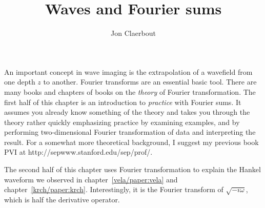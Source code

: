 \def\CAKEDIR{.}

\title{Waves and Fourier sums}
\author{Jon Claerbout}
\maketitle
\label{paper:ft1}
\long\def\HideThis#1{}



\par
An important concept in wave imaging is the extrapolation
of a wavefield from one depth $z$ to another.
Fourier transforms are an essential basic tool.
There are many books and chapters of books on the
{\em  theory}
of Fourier transformation.
The first half of this chapter is
an introduction to {\em  practice} with Fourier sums.
It assumes you already know something of the theory
and takes you through the theory rather quickly
emphasizing practice by examining examples,
and by performing two-dimensional
Fourier transformation of data and interpreting the result.
For a somewhat more theoretical background,
I suggest my previous book PVI at
http://sepwww.stanford.edu/sep/prof/.


\par
The second half of this chapter
uses Fourier transformation
to explain the Hankel waveform we observed
in chapter~\ref{vela/paper:vela} and chapter~\ref{krch/paper:krch}.
Interestingly,
it is the Fourier transform of $\sqrt{-i\omega}$,
which is half the derivative operator.

